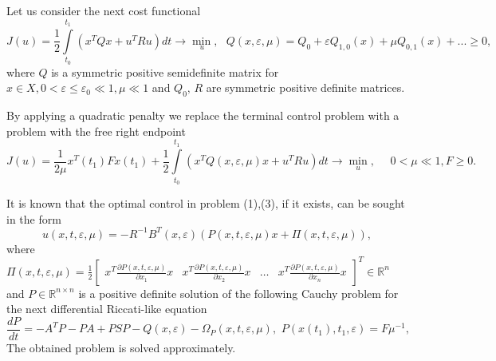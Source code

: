 \documentclass[12pt]{llncs}
\begin{document}
Let us consider the next cost functional
\begin{equation}
	J(u) = \frac{1}{2}\int\limits_{{t_0}}^{{t_1}} {\left( {{x^T}Qx + {u^T}Ru} \right)dt}  \to \mathop {\min }\limits_{\,u} ,\,\,\,\,Q(x,\varepsilon, \mu ) = {Q_0} + \varepsilon Q_{1,0}(x) + \mu Q_{0,1}(x)+... \geq 0,
\end{equation}
where $Q$  is a symmetric positive semidefinite matrix for $x \in X, 0 < \varepsilon \leq{\varepsilon _0} \ll 1 , \mu  \ll  1 $  and  ${Q_0},\,R$  are  symmetric positive definite matrices.

By applying a quadratic penalty we replace the terminal control problem with a problem with the free right endpoint
\begin{equation}
	J(u) = \frac{1}{{2\mu }}{x^T}({t_1})Fx({t_1}) + \frac{1}{2}\int\limits_{{t_0}}^{{t_1}} {\left( {{x^T}Q(x,\varepsilon, \mu )x + {u^T}Ru} \right)dt}  \to \mathop {\min }\limits_u ,\,\,\quad 0 < \mu  \ll 1,F \geq 0.
\end{equation}

It is known \cite{Heydari2015} that the optimal control in problem (1),(3), if it exists, can be sought in the form
\begin{equation}
	u(x,t,\varepsilon, \mu ) =  - {R^{ - 1}}{B^T}(x,\varepsilon )(P(x,t,\varepsilon, \mu )x + \Pi (x,t,\varepsilon, \mu )),
\end{equation}
where $\Pi (x,t,\varepsilon, \mu) = \frac{1}{2}{\left[ {\begin{array}{*{20}{c}}
			{{x^T}\frac{{\partial P(x,t,\varepsilon,\mu)}}{{\partial {x_1}}}x}&{{x^T}\frac{{\partial P(x,t,\varepsilon,\mu)}}{{\partial {x_2}}}x}& \ldots &{{x^T}\frac{{\partial P(x,t,\varepsilon,\mu)}}{{\partial {x_n}}}x}
	\end{array}} \right]^T} \in {\mathbb{R}^n}$ and $P \in {\mathbb{R}^{n \times n}}$ is a positive definite solution of the following Cauchy problem for the next differential Riccati-like equation
\begin{equation}
	\frac{{dP}}{{dt}} =  - {A^T}P - PA + PSP - Q(x,\varepsilon ) - {\Omega _P}(x,t,\varepsilon, \mu),\,\,P(x({t_1}),{t_1},\varepsilon ) = F{\mu ^{-1}},
\end{equation}
The obtained problem is solved approximately.
\end{document}
